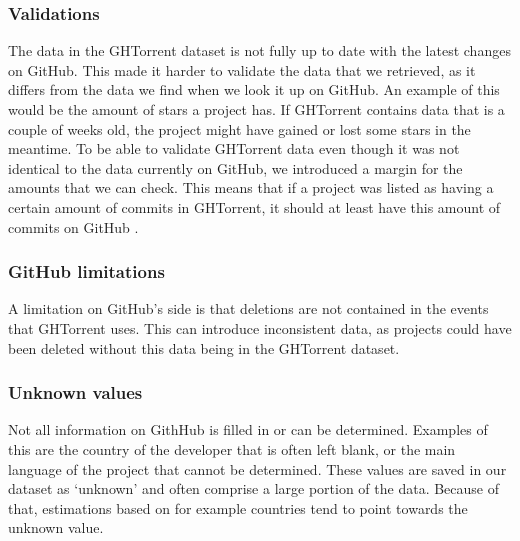 \subsubsection{Validations}
The data in the GHTorrent dataset is not fully up to date with the latest changes on GitHub.
This made it harder to validate the data that we retrieved, as it differs from the data we find when we look it up on GitHub.
An example of this would be the amount of stars a project has.
If GHTorrent contains data that is a couple of weeks old, the project might have gained or lost some stars in the meantime.
To be able to validate GHTorrent data even though it was not identical to the data currently on GitHub, we introduced a margin for the amounts that we can check.
This means that if a project was listed as having a certain amount of commits in GHTorrent, it should at least have this amount of commits on GitHub . \\

\subsubsection{GitHub limitations}
A limitation on GitHub's side is that deletions are not contained in the events that GHTorrent uses.\cite{gousios-2013}
This can introduce inconsistent data, as projects could have been deleted without this data being in the GHTorrent dataset.\\

\subsubsection{Unknown values}
Not all information on GithHub is filled in or can be determined.
Examples of this are the country of the developer that is often left blank, or the main language of the project that cannot be determined.
These values are saved in our dataset as `unknown' and often comprise a large portion of the data.
Because of that, estimations based on for example countries tend to point towards the unknown value.
